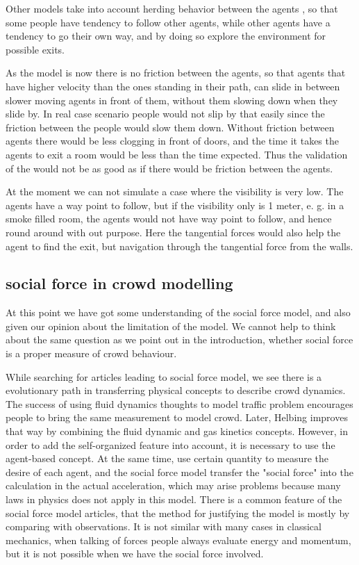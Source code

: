 Other models take into account herding behavior between the agents  
\cite{helbing00}, so that some people have tendency to follow other agents, 
while other agents have a tendency to go their own way,  and by doing so 
explore the environment for possible exits.

As the model is now there is no friction between the agents, so that agents 
that have higher velocity than the ones standing in their path, can slide in 
between slower moving agents in front of them, without them slowing down when 
they slide by. In real case scenario people would not slip by that easily 
since the friction between the people would slow them down.  Without friction 
between agents there would be less clogging in front of doors, and the time it 
takes the agents to exit a room would be less than the time expected. Thus the 
validation of the would not be as good as if there would be friction between 
the agents.

At the moment we can not simulate a case where the visibility is very low. The 
agents have a way point to follow, but if the visibility only is 1 meter, e. 
g. in a smoke filled room, the  agents would not have way point to follow, and 
hence round around with out purpose. Here the tangential forces would also 
help the agent to find the exit, but navigation through the tangential force 
from the walls.

\subsection{social force in crowd modelling}
At this point we have got some understanding of the social force model, and 
also given our opinion about the limitation of the model. We cannot help to 
think about the same question as we point out in the introduction, whether 
social force is a proper measure of crowd behaviour. 

While searching for articles leading to social force model, we see there is a 
evolutionary path in transferring physical concepts to describe crowd dynamics.
The success of using fluid dynamics thoughts to model traffic problem encourages 
people to bring the same measurement to model crowd. 
Later, Helbing improves that way by combining the fluid dynamic and gas kinetics 
concepts. \cite{social-force} However, in order to add the self-organized feature 
into account, it is necessary to use the agent-based concept.  At the same time, 
use certain quantity to measure the desire of each agent, and the social force model 
transfer the "social force" into the calculation in the actual acceleration, which may
arise problems because many laws in physics does not apply in this model. 
There is a common feature of the social force model articles, that the method for 
justifying the model is mostly by comparing with observations. It is not 
similar with many cases in classical mechanics, when talking of forces people 
always evaluate energy and momentum, but it is not possible when we have 
the social force involved.
